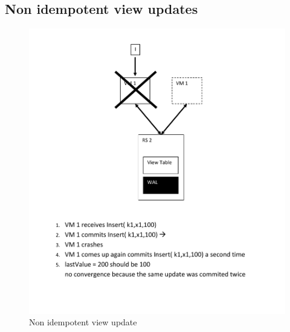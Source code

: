 \subsection{Non idempotent view updates}
\begin{figure}[h!]
  \centering
    \includegraphics[scale=0.8]{figures/CO_NonIdempotentViewUpdates}
     \caption{Non idempotent view update}
    \label{fig:co_nonidempotentviewupdates}
\end{figure}

\newpage

